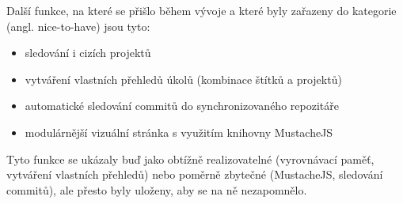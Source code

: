 Další funkce, na které se přišlo během vývoje a které byly zařazeny do kategorie  (angl. nice-to-have) jsou tyto:

\begin{itemize}
\item sledování i cizích projektů
\item vytváření vlastních přehledů úkolů (kombinace štítků a projektů)
\item automatické sledování commitů do synchronizovaného repozitáře
\item modulárnější vizuální stránka s využitím knihovny MustacheJS
\end{itemize}

Tyto funkce se ukázaly buď jako obtížně realizovatelné (vyrovnávací paměť, vytváření vlastních přehledů) nebo poměrně zbytečné (MustacheJS, sledování commitů), ale přesto byly uloženy, aby se na ně nezapomnělo.